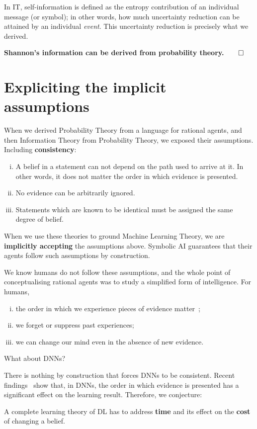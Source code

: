 In \acf{IT}, self-information is defined as the entropy contribution of an individual message (or symbol); in other words, how much uncertainty reduction can be attained by an individual \emph{event}. This uncertainty reduction is precisely what we derived.

\textbf{Shannon's information can be derived from probability theory.}\label{sec:probability2information}$\qedhere$

\section{Expliciting the implicit assumptions} When we derived Probability Theory from a language for rational agents, and then Information Theory from Probability Theory, we exposed their assumptions. Including \textbf{consistency}:
\begin{enumerate}
	[i.]
	\item A belief in a statement can not depend on the path used to arrive at it. In other words, it does not matter the order in which evidence is presented.
	\item No evidence can be arbitrarily ignored.
	\item Statements which are known to be identical must be assigned the same degree of belief.
\end{enumerate}

When we use these theories to ground Machine Learning Theory, we are \textbf{implicitly accepting} the assumptions above. Symbolic AI guarantees that their agents follow such assumptions by construction.

We know humans do not follow these assumptions, and the whole point of conceptualising rational agents was to study a simplified form of intelligence. For humans,
\begin{enumerate}
	[i.]
	\item the order in which we experience pieces of evidence matter~\cite{wiesel:1982};
	\item we forget or suppress past experiences;
	\item we can change our mind even in the absence of new evidence.
\end{enumerate}
What about \aclp{DNN}?

There is nothing by construction that forces \acsp{DNN} to be consistent. Recent findings~\cite{achille:2018critical} show that, in \acsp{DNN}, the order in which evidence is presented has a significant effect on the learning result. Therefore, we conjecture:
\begin{conjecture}
	A complete learning theory of \acf{DL} has to address \textbf{time} and its effect on the \textbf{cost} of changing a belief.
\end{conjecture}


